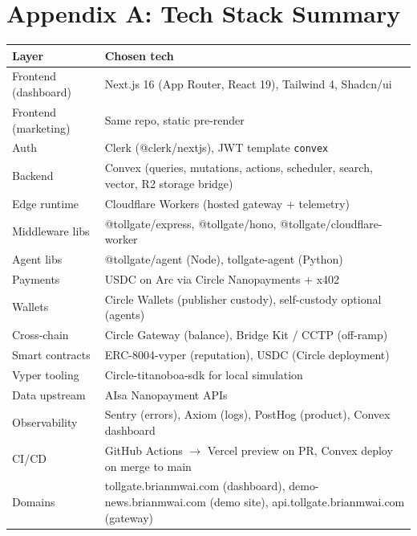 \documentclass[11pt,a4paper]{article}
\begin{document}
\section*{Appendix A: Tech Stack Summary}

\begin{table}[H]
\centering
\footnotesize
\begin{tabularx}{\textwidth}{@{} l X @{}}
\toprule
\textbf{Layer} & \textbf{Chosen tech} \\
\midrule
Frontend (dashboard) & Next.js 16 (App Router, React 19), Tailwind 4, Shadcn/ui \\
Frontend (marketing) & Same repo, static pre-render \\
Auth & Clerk (@clerk/nextjs), JWT template \texttt{convex} \\
Backend & Convex (queries, mutations, actions, scheduler, search, vector, R2 storage bridge) \\
Edge runtime & Cloudflare Workers (hosted gateway + telemetry) \\
Middleware libs & @tollgate/express, @tollgate/hono, @tollgate/cloudflare-worker \\
Agent libs & @tollgate/agent (Node), tollgate-agent (Python) \\
Payments & USDC on Arc via Circle Nanopayments + x402 \\
Wallets & Circle Wallets (publisher custody), self-custody optional (agents) \\
Cross-chain & Circle Gateway (balance), Bridge Kit / CCTP (off-ramp) \\
Smart contracts & ERC-8004-vyper (reputation), USDC (Circle deployment) \\
Vyper tooling & Circle-titanoboa-sdk for local simulation \\
Data upstream & AIsa Nanopayment APIs \\
Observability & Sentry (errors), Axiom (logs), PostHog (product), Convex dashboard \\
CI/CD & GitHub Actions $\rightarrow$ Vercel preview on PR, Convex deploy on merge to main \\
Domains & tollgate.brianmwai.com (dashboard), demo-news.brianmwai.com (demo site), api.tollgate.brianmwai.com (gateway) \\
\bottomrule
\end{tabularx}
\end{table}
\end{document}

